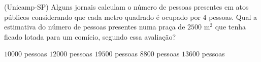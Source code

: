 \noindent\parbox{\linewidth}{

(Unicamp-SP) Alguns jornais calculam o número de pessoas presentes em atos públicos considerando que cada metro quadrado é ocupado por $4$ pessoas. Qual a estimativa do número de pessoas presentes numa praça de $2500$ m$^2$ que tenha ficado lotada para um comício, segundo essa avaliação?

$10000$ pessoas
$12000$ pessoas
$19500$ pessoas
$8800$ pessoas
$13600$ pessoas



}


